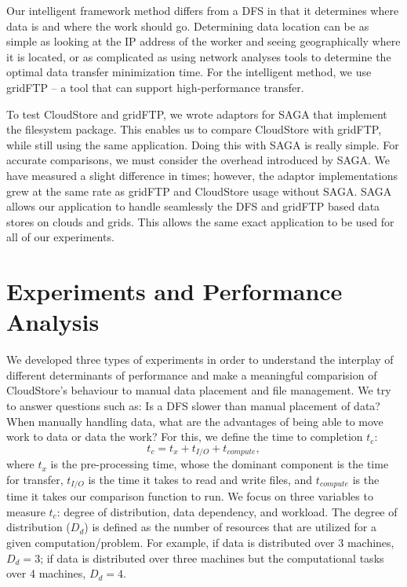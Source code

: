 \documentclass{rspublic}
\begin{document}
Our intelligent framework method differs from a DFS in that it
determines where data is and where the work should go. Determining
data location can be as simple as looking at the IP address of the
worker and seeing geographically where it is located, or as
complicated as using network analyses tools to determine the optimal
data transfer minimization time. For the intelligent method, we use
gridFTP -- a tool that can support high-performance transfer.

To test CloudStore and gridFTP, we wrote adaptors for SAGA that
implement the filesystem package. This enables us to compare CloudStore
with gridFTP, while still using the same application. Doing this with
SAGA is really simple. For accurate comparisons, we must consider the
overhead introduced by SAGA. We have measured a slight difference in
times; however, the adaptor implementations grew at the same rate as
gridFTP and CloudStore usage without SAGA.  SAGA allows our application
to handle seamlessly the DFS and gridFTP based data stores on clouds and
grids.  This allows the same exact application to be used for all of our
experiments.


\vspace{-0.3cm}

\section{Experiments and Performance Analysis} 
We developed three types of experiments in order to understand the
interplay of different determinants of performance and make a
meaningful comparision of CloudStore's behaviour to manual data
placement and file management. We try to answer questions such as: Is
a DFS slower than manual placement of data?  When manually handling
data, what are the advantages of being able to move work to data or
data the work? For this, we define the time to completion $t_c$:
 \begin{equation}
t_c = t_x + t_{I/O} + t_{compute},
\end{equation}
where $t_x$ is the pre-processing time, whose the dominant component is
the time for transfer, $t_{I/O}$ is the time it takes to read and write
files, and $t_{compute}$ is the time it takes our comparison function to
run. We focus on three variables to measure $t_c$: degree of
distribution, data dependency, and workload. The degree of distribution
($D_d$) is defined as the number of resources that are utilized for a
given computation/problem. For example, if data is distributed over 3
machines, $D_d=3$; if data is distributed over three machines but the
computational tasks over 4 machines, $D_d=4$.
\end{document}
